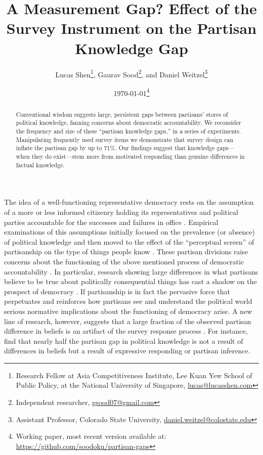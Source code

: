 \documentclass[12pt, letterpaper]{article}
\title{A Measurement Gap? Effect of the Survey Instrument on the Partisan Knowledge Gap}
\author{Lucas Shen\thanks{Research Fellow at Asia Competitiveness Institute, Lee Kuan Yew School of Public Policy, at the National University of Singapore, \href{lucas@lucasshen.com}{lucas@lucasshen.com}},
  Gaurav Sood\thanks{Independent researcher, \href{gsood07@gmail.com}{gsood07@gmail.com}}, and
  Daniel Weitzel\thanks{Assistant Professor, Colorado State University, \href{mailto:daniel.weitzel@colostate.edu}{daniel.weitzel@colostate.edu}}}
\date{\today \thanks{Working paper, most recent version available at: \href{https://github.com/soodoku/partisan-gaps}{https://github.com/soodoku/partisan-gaps}}}
\begin{document}
\maketitle
\thispagestyle{empty}

\begin{abstract}

\noindent Conventional wisdom suggests large, persistent gaps between partisans' stores of political knowledge, fanning concerns about democratic accountability. We reconsider the frequency and size of these ``partisan knowledge gaps,'' in a series of experiments. Manipulating frequently used survey items we demonstrate that survey design can inflate the partisan gap by up to 71\%. Our findings suggest that knowledge gaps---when they do exist---stem more from motivated responding than genuine differences in factual knowledge.

\end{abstract}

\vspace{.2in}


\newpage

\doublespacing

The idea of a well-functioning representative democracy rests on the assumption of a more or less informed citizenry holding its representatives and political parties accountable for the successes and failures in office \citep{schattschneider-1960}. Empirical examinations of this assumptions initially focused on the prevalence (or absence) of political knowledge \citep{dellicarpini} and then moved to the effect of the ``perceptual screen'' \citep[p. 133]{campbell1980american} of partisanship on the type of things people know \citep{bartels_2002}. These partisan divisions raise concerns about the functioning of the above mentioned process of democratic accountability \citep{hochschild2015isn}. In particular, research showing large differences in what partisans believe to be true about politically consequential things has cast a shadow on the prospect of democracy \citep{campbell1980american, jerit2012partisan}. If partisanship is in fact the pervasive force that perpetuates and reinforces how partisans see and understand the political world \citep[p. 138]{bartels_2002} serious normative implications about the functioning of democracy arise. A new line of research, however, suggests that a large fraction of the observed partisan difference in beliefs is an artifact of the survey response process \citep{bullocketal_2015,huber_yair_2018, prior2015you}. For instance, \cite{bullocketal_2015} find that nearly half the partisan gap in political knowledge is not a result of differences in beliefs but a result of expressive responding or partisan inference.
\end{document}
